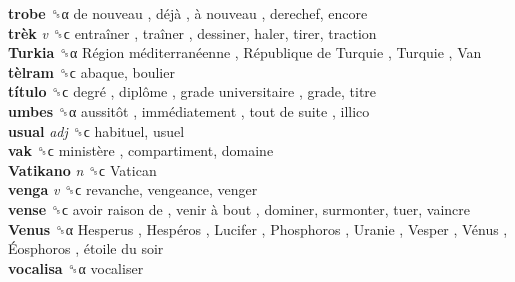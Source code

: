 \textbf{trobe} ␝α   de nouveau ,  déjà ,  à nouveau , derechef, encore  \\
\textbf{trèk} \emph{v}  ␝ϲ   entraîner ,  traîner , dessiner, haler, tirer, traction  \\
\textbf{Turkia} ␝α   Région méditerranéenne ,  République de Turquie ,  Turquie ,  Van   \\
\textbf{tèlram} ␝ϲ  abaque, boulier  \\
\textbf{título} ␝ϲ   degré ,  diplôme ,  grade universitaire , grade, titre  \\
\textbf{umbes} ␝α   aussitôt ,  immédiatement ,  tout de suite , illico  \\
\textbf{usual} \emph{adj}  ␝ϲ  habituel, usuel  \\
\textbf{vak} ␝ϲ   ministère , compartiment, domaine  \\
\textbf{Vatikano} \emph{n}  ␝ϲ   Vatican   \\
\textbf{venga} \emph{v}  ␝ϲ  revanche, vengeance, venger  \\
\textbf{vense} ␝ϲ   avoir raison de ,  venir à bout , dominer, surmonter, tuer, vaincre  \\
\textbf{Venus} ␝α   Hesperus ,  Hespéros ,  Lucifer ,  Phosphoros ,  Uranie ,  Vesper ,  Vénus ,  Éosphoros ,  étoile du soir   \\
\textbf{vocalisa} ␝α  vocaliser  \\

